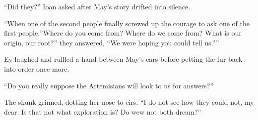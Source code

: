 ``Did they?'' Ioan asked after May's story drifted into silence.

``When one of the second people finally screwed up the courage to ask one of the first people,''Where do you come from? Where do we come from? What is our origin, our root?'' they answered, ``We were hoping you could tell us.''''

Ey laughed and ruffled a hand between May's ears before petting the fur back into order once more.

``Do you really suppose the Artemisians will look to us for answers?''

The skunk grinned, dotting her nose to eirs. ``I do not see how they could not, my dear. Is that not what exploration is? Do wew not both dream?''
